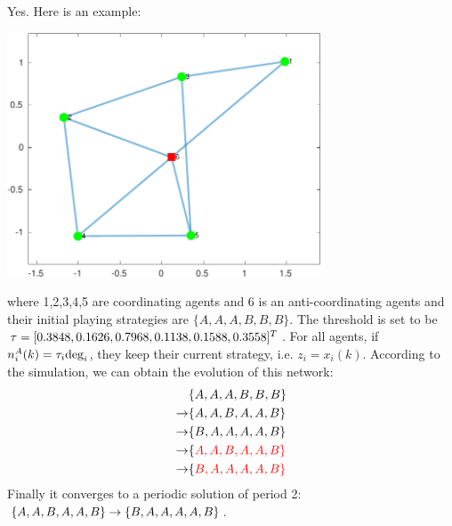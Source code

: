 \documentclass[a4 paper, 12pt]{article}
\begin{document}
 Yes. Here is an example:
\begin{center}
        \includegraphics[width = 0.7\textwidth]{pd2.pdf}
\end{center}
where 1,2,3,4,5 are coordinating agents and 6 is an anti-coordinating agents and their initial playing strategies are $\{A,A,A,B,B,B\}$. The threshold is set to be $\tau = [ 0.3848,0.1626,\\0.7968,0.1138,0.1588,0.3558]^T$. For all agents, if $n_i^A(k)=\tau_i\textnormal{deg}_i$, they keep their current strategy, i.e. $z_i = x_i(k)$. According to the simulation, we can obtain the evolution of this network:
\begin{equation*}
        \begin{aligned}
                &\{A,A,A,B,B,B\} \\
                \rightarrow &\{A,A,B,A,A,B\} \\ 
                \rightarrow &\{B,A,A,A,A,B\} \\
                \rightarrow &\{\color{red}A,A,B,A,A,B\} \\
                \rightarrow &\{\color{red}B,A,A,A,A,B\}
        \end{aligned}
\end{equation*}
Finally it converges to a periodic solution of period 2: $\{A,A,B,A,A,B\}\rightarrow\{B,A,A,A,A,B\}$.
\end{document}
